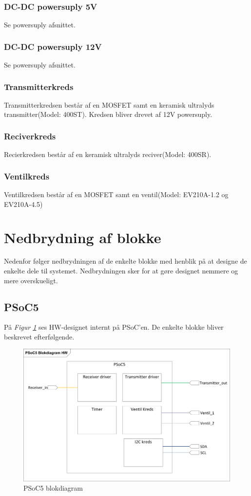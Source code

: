 \subsubsection{DC-DC powersuply 5V}
Se powersuply afsnittet.
\subsubsection{DC-DC powersuply 12V}
Se powersuply afsnittet.
\subsubsection{Transmitterkreds}
Transmitterkredsen består af en MOSFET samt en keramisk ultralyds transmitter(Model: 400ST). Kredsen bliver drevet af 12V powersuply. 
\subsubsection{Reciverkreds}
Recierkredsen består af en keramisk ultralyds reciver(Model: 400SR).
\subsubsection{Ventilkreds}
Ventilkredsen består af en MOSFET samt en ventil(Model: EV210A-1.2 og EV210A-4.5)
\newpage
\section{Nedbrydning af blokke}
Nedenfor følger nedbrydningen af de enkelte blokke med henblik på at designe de enkelte dele til systemet. Nedbrydningen sker for at gøre designet nemmere og mere overskueligt.
\subsection{PSoC5}
På \textit{Figur \ref{fig:PSoCBlok}} ses HW-designet internt på PSoC'en. De enkelte blokke bliver beskrevet efterfølgende.
\begin{figure}[H]
\centering
\includegraphics[width=1\textwidth]{billeder/PSoCBlock}
\caption{PSoC5 blokdiagram}
\label{fig:PSoCBlok}
\end{figure}
